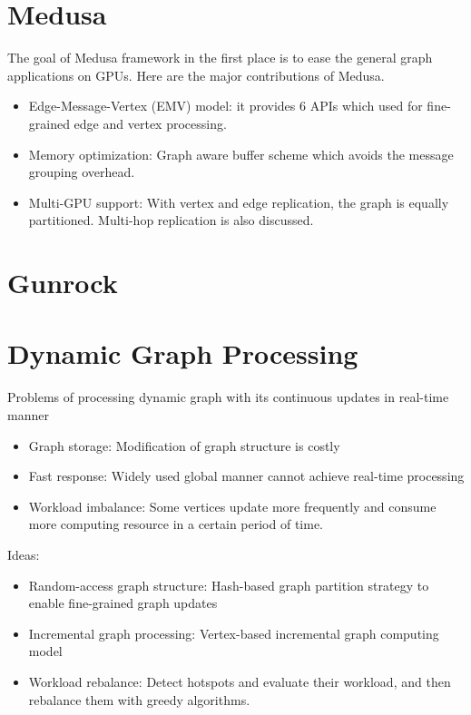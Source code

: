 \section{Medusa}
The goal of Medusa framework in the first place is to ease the general graph applications on GPUs.
Here are the major contributions of Medusa.
\begin{itemize}
    \item Edge-Message-Vertex (EMV) model: it provides 6 APIs which used for fine-grained edge and vertex processing.
    \item Memory optimization: Graph aware buffer scheme which avoids the message grouping overhead. 
    \item Multi-GPU support: With vertex and edge replication, the graph is equally partitioned. Multi-hop replication is also discussed. 
\end{itemize}

\section{Gunrock}

\section{Dynamic Graph Processing}
Problems of processing dynamic graph with its continuous updates in real-time manner
\begin{itemize}
\item Graph storage: Modification of graph structure is costly
\item Fast response: Widely used global manner cannot achieve real-time processing
\item Workload imbalance: Some vertices update more frequently and consume more computing resource in a certain period of time.
\end{itemize}

Ideas:
\begin{itemize}
\item Random-access graph structure: Hash-based graph partition strategy to enable fine-grained graph updates
\item Incremental graph processing: Vertex-based incremental graph computing model
\item Workload rebalance: Detect hotspots and evaluate their workload, and then rebalance them with greedy algorithms.
\end{itemize}
